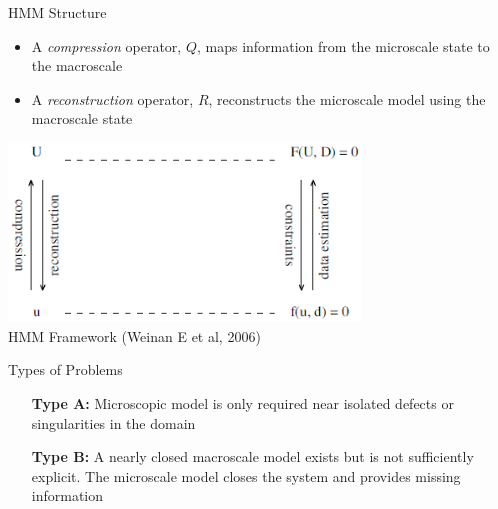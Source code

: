 \documentclass{beamer}
\begin{document}
	\begin{frame}{HMM Structure}
		\begin{itemize}
			\item  A \emph{compression} operator, $Q$, maps information from the microscale state to the macroscale
			\item  A \emph{reconstruction} operator, $R$, reconstructs the microscale model using the macroscale state
		\end{itemize}
		\begin{center}
			\includegraphics[width=0.7\textwidth]{framework.png}
			\\\tiny HMM Framework (Weinan E et al, 2006)
		\end{center}
	\end{frame}
	
	\begin{frame}{Types of Problems}
		\begin{enumerate}[leftmargin=1.75cm]
			\item[\textbf{Type A:}] Microscopic model is only required near isolated defects or singularities in the domain
			\vspace{2em}
			\item[\textbf{Type B:}] A nearly closed macroscale model exists but is not sufficiently explicit. The microscale model closes the system and provides missing information
		\end{enumerate}
	\end{frame}
	
\end{document}
